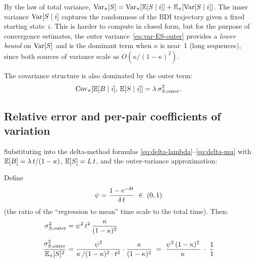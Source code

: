 By the law of total variance,
$\mathrm{Var}_\pi[S] = \mathrm{Var}_\pi[\mathbb{E}[S \mid i]] + \mathbb{E}_\pi[\mathrm{Var}[S \mid i]]$.
The inner variance $\mathrm{Var}[S \mid i]$ captures the randomness of the
BDI trajectory given a fixed starting state~$i$.
This is harder to compute in closed form, but for the purpose of
convergence estimates, the outer variance~\eqref{eq:var-ES-outer}
provides a \emph{lower bound} on $\mathrm{Var}[S]$ and is the dominant term
when $\kappa$ is near~1 (long sequences), since both sources of
variance scale as $O(\kappa/(1-\kappa)^2)$.

The covariance structure is also dominated by the outer term:
\begin{equation}\label{eq:cov-BS-outer}
\mathrm{Cov}_\pi[\mathbb{E}[B \mid i],\, \mathbb{E}[S \mid i]]
  = \lambda\,\sigma^2_{S,\text{outer}}.
\end{equation}

\subsection{Relative error and per-pair coefficients of variation}

Substituting into the delta-method formulas
\eqref{eq:delta-lambda}--\eqref{eq:delta-mu}
with $\mathbb{E}[B] = \lambda\,t/(1-\kappa)$,
$\mathbb{E}[S] = L\,t$, and the outer-variance approximation:

Define
\[
\psi = \frac{1 - e^{-\delta t}}{\delta\,t}
  \;\in\;(0,1)
\]
(the ratio of the ``regression to mean'' time scale to the total time).
Then:
\begin{align}
\sigma^2_{S,\text{outer}} &= \psi^2\,t^2\,\frac{\kappa}{(1-\kappa)^2}
\label{eq:sigma-S-psi}
\\[4pt]
\frac{\sigma^2_{S,\text{outer}}}{\mathbb{E}_\pi[S]^2}
  &= \frac{\psi^2}{\kappa\,/(1-\kappa)^2 \cdot t^2}
     \cdot \frac{\kappa}{(1-\kappa)^2}
  \;=\; \frac{\psi^2\,(1-\kappa)^2}{\kappa}
  \;\cdot\; \frac{1}{1}
\notag
\end{align}


